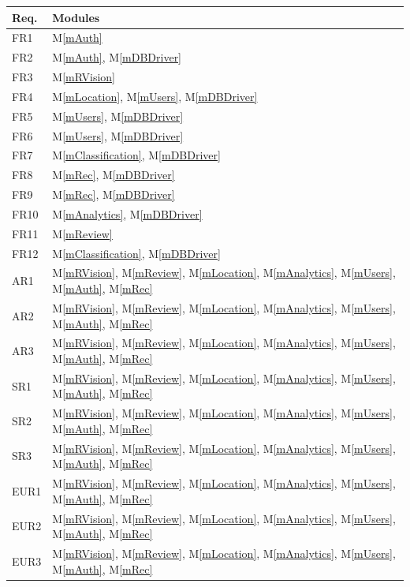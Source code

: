 \documentclass[12pt, titlepage]{article}
\newcommand{\mref}[1]{M\ref{#1}}
\begin{document}
\begin{longtable}{p{} p{}}
\toprule
\textbf{Req.} & \textbf{Modules}\\
\midrule
FR1 & \mref{mAuth}\\
FR2 & \mref{mAuth}, \mref{mDBDriver}\\
FR3 & \mref{mRVision}\\
FR4 & \mref{mLocation}, \mref{mUsers}, \mref{mDBDriver}\\
FR5 & \mref{mUsers}, \mref{mDBDriver}\\
FR6 & \mref{mUsers}, \mref{mDBDriver}\\
FR7 & \mref{mClassification}, \mref{mDBDriver}\\
FR8 & \mref{mRec}, \mref{mDBDriver}\\
FR9 & \mref{mRec}, \mref{mDBDriver}\\
FR10 & \mref{mAnalytics}, \mref{mDBDriver}\\
FR11 & \mref{mReview}\\
FR12 & \mref{mClassification}, \mref{mDBDriver}\\
AR1 & \mref{mRVision}, \mref{mReview}, \mref{mLocation}, \mref{mAnalytics}, \mref{mUsers}, \mref{mAuth}, \mref{mRec}\\
AR2 & \mref{mRVision}, \mref{mReview}, \mref{mLocation}, \mref{mAnalytics}, \mref{mUsers}, \mref{mAuth}, \mref{mRec}\\
AR3 & \mref{mRVision}, \mref{mReview}, \mref{mLocation}, \mref{mAnalytics}, \mref{mUsers}, \mref{mAuth}, \mref{mRec}\\
SR1 & \mref{mRVision}, \mref{mReview}, \mref{mLocation}, \mref{mAnalytics}, \mref{mUsers}, \mref{mAuth}, \mref{mRec}\\
SR2 & \mref{mRVision}, \mref{mReview}, \mref{mLocation}, \mref{mAnalytics}, \mref{mUsers}, \mref{mAuth}, \mref{mRec}\\
SR3 & \mref{mRVision}, \mref{mReview}, \mref{mLocation}, \mref{mAnalytics}, \mref{mUsers}, \mref{mAuth}, \mref{mRec}\\
EUR1 & \mref{mRVision}, \mref{mReview}, \mref{mLocation}, \mref{mAnalytics}, \mref{mUsers}, \mref{mAuth}, \mref{mRec}\\
EUR2 & \mref{mRVision}, \mref{mReview}, \mref{mLocation}, \mref{mAnalytics}, \mref{mUsers}, \mref{mAuth}, \mref{mRec}\\
EUR3 & \mref{mRVision}, \mref{mReview}, \mref{mLocation}, \mref{mAnalytics}, \mref{mUsers}, \mref{mAuth}, \mref{mRec}\\

\end{longtable}
\end{document}
